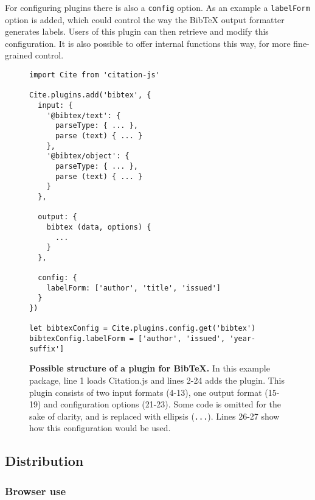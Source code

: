\documentclass[fleqn,10pt,lineno]{wlpeerj} %
\begin{document}
For configuring plugins there is also a \texttt{config} option. As an example a \texttt{labelForm} option is added, which could control the way the BibTeX output formatter generates labels. Users of this plugin can then retrieve and modify this configuration. It is also possible to offer internal functions this way, for more fine-grained control.

\begin{figure}[ht]
\centering
\begin{verbatim}
import Cite from 'citation-js'

Cite.plugins.add('bibtex', {
  input: {
    '@bibtex/text': {
      parseType: { ... },
      parse (text) { ... }
    },
    '@bibtex/object': {
      parseType: { ... },
      parse (text) { ... }
    }
  },

  output: {
    bibtex (data, options) {
      ...
    }
  },

  config: {
    labelForm: ['author', 'title', 'issued']
  }
})

let bibtexConfig = Cite.plugins.config.get('bibtex')
bibtexConfig.labelForm = ['author', 'issued', 'year-suffix']
\end{verbatim}
\caption{\textbf{Possible structure of a plugin for BibTeX.}
In this example package, line 1 loads Citation.js and lines 2-24 adds the plugin. This plugin consists of two input formats (4-13), one output format (15-19) and configuration options (21-23). Some code is omitted for the sake of clarity, and is replaced with ellipsis (\texttt{...}). Lines 26-27 show how this configuration would be used.
}
\label{code:plugin}
\end{figure}

\subsection*{Distribution}

\subsubsection*{Browser use}


\subsection*{}
\end{document}
